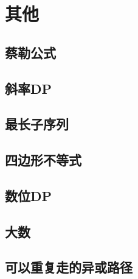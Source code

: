 \documentclass[main.tex]{subfiles}
\begin{document}
\chapter{其他}
\section{蔡勒公式}
    
\section{斜率DP}
    
\section{最长子序列}
    
\section{四边形不等式}
    
\section{数位DP}
    
\section{大数}
    
\section{可以重复走的异或路径}
    
\end{document}
